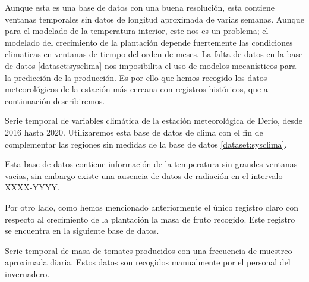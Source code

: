 Aunque esta es una base de datos con una buena resolución, esta contiene ventanas temporales sin datos de longitud aproximada de varias semanas. Aunque para el modelado de la temperatura interior, este nos es un problema; el modelado del crecimiento de la plantación depende fuertemente las condiciones climaticas en ventanas de tiempo del orden de meses. La falta de datos en la base de datos \ref{dataset:sysclima} nos imposibilita el uso de modelos mecanísticos para la predicción de la producción. Es por ello que hemos recogido los datos meteorológicos de la estación más cercana con registros históricos, que a continuación describiremos.

\begin{dataset}\label{dataset:Euskalmet}
    Serie temporal de variables climática de la estación meteorológica de Derio, desde 2016 hasta 2020. Utilizaremos esta base de datos de clima con el fin de complementar las regiones sin medidas de la base de datos \ref{dataset:sysclima}.
\end{dataset}

Esta base de datos contiene información de la temperatura sin grandes ventanas vacias, sin embargo existe una ausencia de datos de radiación en el intervalo XXXX-YYYY. 

Por otro lado, como hemos mencionado anteriormente el único registro claro con respecto al crecimiento de la plantación la masa de fruto recogido. Este registro se encuentra en la siguiente base de datos.

\begin{dataset} 
    Serie temporal de masa de tomates producidos con una frecuencia de muestreo aproximada diaria. Estos datos son recogidos manualmente por el personal del invernadero.
\end{dataset}


\def\myarray{ Time Stamp    /   -               /                           , 
              Var2          /   $-$             /  Greenhouse Sector        ,
              Textt         /   $^\circ C$      /  Exterior Temperature     ,
              HRExt         /   $W/m^2$         /  Humedad relativa Exterior,
              RadExd        /   $W/m^2$         /  Exterior Radiation       }



